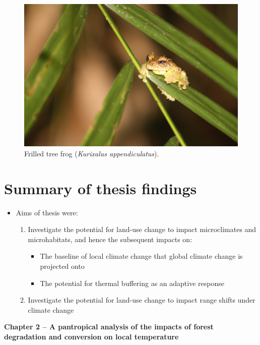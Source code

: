 \documentclass[12pt,a4paper,]{report}
\providecommand{\tightlist}{%
  \setlength{\itemsep}{0pt}\setlength{\parskip}{0pt}}
\theoremstyle{definition}
\theoremstyle{definition}
\theoremstyle{definition}
\theoremstyle{remark}
\begin{document}
\begin{figure}[!htb]
\centering
\includegraphics[width=13cm]{pics/Frilled_tree_frog.jpg}
\caption*{Frilled tree frog (\textit{Kurixalus appendiculatus}).}
\end{figure}

\section{Summary of thesis findings}\label{summary-of-thesis-findings}

\begin{itemize}
\tightlist
\item
  Aims of thesis were:

  \begin{enumerate}
  \def\labelenumi{\arabic{enumi}.}
  \tightlist
  \item
    Investigate the potential for land-use change to impact
    microclimates and microhabitats, and hence the subsequent impacts
    on:

    \begin{itemize}
    \tightlist
    \item
      The baseline of local climate change that global climate change is
      projected onto
    \item
      The potential for thermal buffering as an adaptive response
    \end{itemize}
  \item
    Investigate the potential for land-use change to impact range shifts
    under climate change
  \end{enumerate}
\end{itemize}

\textbf{Chapter 2 -- A pantropical analysis of the impacts of forest
degradation and conversion on local temperature}
\end{document}
